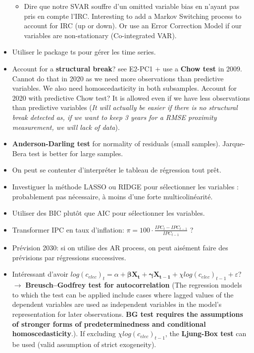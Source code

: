 \begin{itemize}
\begin{itemize}
    \item Dire que notre SVAR souffre d'un omitted variable bias en n'ayant pas pris en compte l'IRC. Interesting to add a Markov Switching process to account for IRC (up or down). Or use an Error Correction Model if our variables are non-stationary (Co-integrated VAR).
\end{itemize}
\item Utiliser le package ts pour gérer les time series.
\item Account for a \textbf{structural break}? see E2-PC1 + use a \textbf{Chow test} in 2009. Cannot do that in 2020 as we need more observations than predictive variables. We also need homoscedasticity in both subsamples. Account for 2020 with predictive Chow test? It is allowed even if we have less observations than predictive variables (\textit{It will actually be easier if there is no structural break detected as, if we want to keep 3 years for a RMSE proximity measurement, we will lack of data}).
\item \textbf{Anderson-Darling test} for normality of residuals (small samples). Jarque-Bera test is better for large samples. 
\item On peut se contenter d'interpréter le tableau de régression tout prêt.
\item Investiguer la méthode LASSO ou RIDGE pour sélectionner les variables : probablement pas nécessaire, à moins d'une forte multicolinéarité. 
\item Utiliser des BIC plutôt que AIC pour sélectionner les variables.
\item Transformer IPC en taux d'inflation: $\pi = 100 \cdot \frac{IPC_t - IPC_{t-1}}{IPC_{t-1}}$ ?
\item Prévision 2030: si on utilise des AR process, on peut aisément faire des prévisions par régressions successives.
\item Intéressant d'avoir $log(c_{elec})_t = \alpha + \boldsymbol{\beta X_t} + \boldsymbol{\gamma X_{t-1}} + {\chi log(c_{elec})_{t-1}} + \varepsilon$? $\to$ \textbf{Breusch–Godfrey test for autocorrelation} (The regression models to which the test can be applied include cases where lagged values of the dependent variables are used as independent variables in the model's representation for later observations. \textbf{BG test requires the assumptions of stronger forms of predeterminedness and conditional homoscedasticity}.). If excluding $\chi log(c_{elec})_{t-1}$, the \textbf{Ljung-Box test} can be used (valid assumption of strict exogeneity).
\end{itemize}

